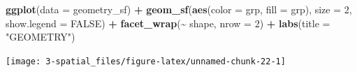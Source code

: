 \documentclass[
]{report}
\newenvironment{Shaded}{\begin{snugshade}}{\end{snugshade}}
\newcommand{\DataTypeTok}[1]{\textcolor[rgb]{0.13,0.29,0.53}{#1}}
\newcommand{\DecValTok}[1]{\textcolor[rgb]{0.00,0.00,0.81}{#1}}
\newcommand{\KeywordTok}[1]{\textcolor[rgb]{0.13,0.29,0.53}{\textbf{#1}}}
\newcommand{\NormalTok}[1]{#1}
\newcommand{\OperatorTok}[1]{\textcolor[rgb]{0.81,0.36,0.00}{\textbf{#1}}}
\newcommand{\OtherTok}[1]{\textcolor[rgb]{0.56,0.35,0.01}{#1}}
\newcommand{\StringTok}[1]{\textcolor[rgb]{0.31,0.60,0.02}{#1}}
\begin{document}
\begin{Shaded}
\begin{Highlighting}[]
\KeywordTok{ggplot}\NormalTok{(}\DataTypeTok{data =}\NormalTok{ geometry\_sf) }\OperatorTok{+}
\StringTok{  }\KeywordTok{geom\_sf}\NormalTok{(}\KeywordTok{aes}\NormalTok{(}\DataTypeTok{color =}\NormalTok{ grp, }\DataTypeTok{fill =}\NormalTok{ grp), }\DataTypeTok{size =} \DecValTok{2}\NormalTok{, }\DataTypeTok{show.legend =} \OtherTok{FALSE}\NormalTok{) }\OperatorTok{+}
\StringTok{  }\KeywordTok{facet\_wrap}\NormalTok{(}\OperatorTok{\textasciitilde{}}\StringTok{ }\NormalTok{shape, }\DataTypeTok{nrow =} \DecValTok{2}\NormalTok{) }\OperatorTok{+}
\StringTok{  }\KeywordTok{labs}\NormalTok{(}\DataTypeTok{title =} \StringTok{"GEOMETRY"}\NormalTok{)}
\end{Highlighting}
\end{Shaded}

\begin{center}\texttt{[image: 3-spatial\_files/figure-latex/unnamed-chunk-22-1]} \end{center}

  
\end{document}
